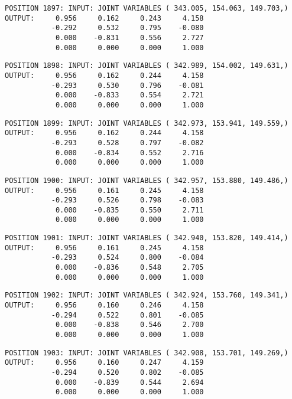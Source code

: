 \begin{verbatim}
POSITION 1897: INPUT: JOINT VARIABLES ( 343.005, 154.063, 149.703,)
OUTPUT:     0.956     0.162     0.243     4.158
           -0.292     0.532     0.795    -0.080
            0.000    -0.831     0.556     2.727
            0.000     0.000     0.000     1.000
\end{verbatim} \pagebreak[1]\begin{verbatim}
POSITION 1898: INPUT: JOINT VARIABLES ( 342.989, 154.002, 149.631,)
OUTPUT:     0.956     0.162     0.244     4.158
           -0.293     0.530     0.796    -0.081
            0.000    -0.833     0.554     2.721
            0.000     0.000     0.000     1.000
\end{verbatim} \pagebreak[1]\begin{verbatim}
POSITION 1899: INPUT: JOINT VARIABLES ( 342.973, 153.941, 149.559,)
OUTPUT:     0.956     0.162     0.244     4.158
           -0.293     0.528     0.797    -0.082
            0.000    -0.834     0.552     2.716
            0.000     0.000     0.000     1.000
\end{verbatim} \pagebreak[1]\begin{verbatim}
POSITION 1900: INPUT: JOINT VARIABLES ( 342.957, 153.880, 149.486,)
OUTPUT:     0.956     0.161     0.245     4.158
           -0.293     0.526     0.798    -0.083
            0.000    -0.835     0.550     2.711
            0.000     0.000     0.000     1.000
\end{verbatim} \pagebreak[1]\begin{verbatim}
POSITION 1901: INPUT: JOINT VARIABLES ( 342.940, 153.820, 149.414,)
OUTPUT:     0.956     0.161     0.245     4.158
           -0.293     0.524     0.800    -0.084
            0.000    -0.836     0.548     2.705
            0.000     0.000     0.000     1.000
\end{verbatim} \pagebreak[1]\begin{verbatim}
POSITION 1902: INPUT: JOINT VARIABLES ( 342.924, 153.760, 149.341,)
OUTPUT:     0.956     0.160     0.246     4.158
           -0.294     0.522     0.801    -0.085
            0.000    -0.838     0.546     2.700
            0.000     0.000     0.000     1.000
\end{verbatim} \pagebreak[1]\begin{verbatim}
POSITION 1903: INPUT: JOINT VARIABLES ( 342.908, 153.701, 149.269,)
OUTPUT:     0.956     0.160     0.247     4.159
           -0.294     0.520     0.802    -0.085
            0.000    -0.839     0.544     2.694
            0.000     0.000     0.000     1.000
\end{verbatim} \pagebreak[1]\begin{verbatim}

\end{verbatim}
